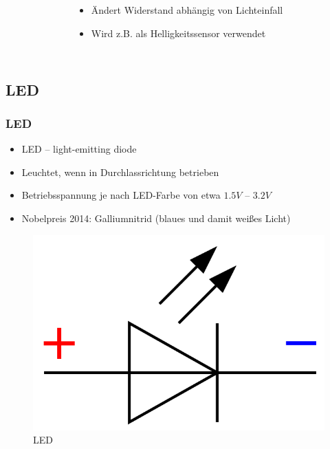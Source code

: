\begin{frame}
\begin{columns}[c]
\begin{center}
\begin{figure}
      \end{figure}
    \end{center}
    \column{5cm}
    \begin{itemize}
      \item Ändert Widerstand abhängig von Lichteinfall
      \item Wird z.B. als Helligkeitssensor verwendet
    \end{itemize}
  \end{columns}
\end{frame}

\subsection*{LED}

\begin{frame}
  \frametitle{LED}
  \begin{itemize}
    \item LED -- light-emitting diode
    \item Leuchtet, wenn in Durchlassrichtung betrieben
    \item Betriebsspannung je nach LED-Farbe von etwa $1.5V$ -- $3.2V$
    \item Nobelpreis 2014: Galliumnitrid (blaues und damit weißes Licht)
  \end{itemize}
  \begin{center}
    \begin{figure}
      \includegraphics[height=.5\textheight,width=\textwidth,keepaspectratio]{e12/Symbol_LED.png}
      \caption{LED}
    \end{figure}
  \end{center}
\end{frame}

